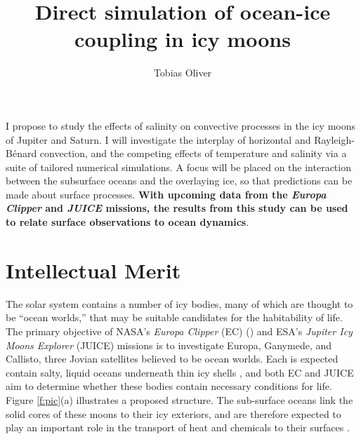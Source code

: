 \documentclass{article}
\title{Direct simulation of ocean-ice coupling in icy moons}
\author{Tobias Oliver}
\date{}
\begin{document}
\newcommand{\citep}[1]{\cite{#1}}
\maketitle

I propose to study the effects of salinity on convective processes in the icy moons of Jupiter and Saturn. 
I will investigate the interplay of horizontal and Rayleigh-B\'enard convection, and the competing effects of temperature and salinity via a suite of tailored numerical simulations. 
A focus will be placed on the interaction between the subsurface oceans and the overlaying ice, so that predictions can be made about surface processes. 
\textbf{With upcoming data from the \textit{Europa Clipper} and \textit{JUICE} missions, the results from this study can be used to relate surface observations to ocean dynamics}.

\section{Intellectual Merit}
The solar system contains a number of icy bodies, many of which are thought to be ``ocean worlds,'' that may be suitable candidates for the habitability of life.
The primary objective of NASA's \textit{Europa Clipper} (EC) (\cite{pC14_JUICE}) and ESA's \textit{Jupiter Icy Moons Explorer} (JUICE)\citep{oG13} missions is to investigate Europa, Ganymede, and Callisto, three Jovian satellites believed to be ocean worlds. Each is expected contain salty, liquid oceans underneath thin icy shells \citep{rP99,fN16}, and both EC and JUICE aim to determine whether these bodies contain necessary conditions for life\citep{tB24}. Figure \ref{f:pic}(a) illustrates a proposed structure.
The sub-surface oceans link the solid cores of these moons to their icy exteriors, and are therefore expected to play an important role in the transport of heat and chemicals to their surfaces \citep{kS20}. 
\end{document}
